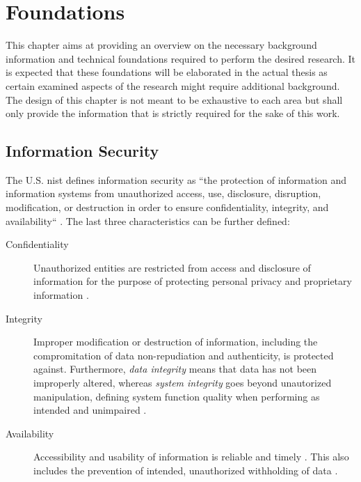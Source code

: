 \chapter{Foundations} \label{ch:foundations}
This chapter aims at providing an overview on the necessary background information and technical foundations required to perform the desired research. It is expected that these foundations will be elaborated in the actual thesis as certain examined aspects of the research might require additional background. The design of this chapter is not meant to be exhaustive to each area but shall only provide the information that is strictly required for the sake of this work.

\section{Information Security} \label{sec:foundations-security}

The U.S. \acf{nist} defines information security as ``the protection of information and information systems from unauthorized access, use, disclosure, disruption, modification, or destruction in order to ensure confidentiality, integrity, and availability`` \cite{nieles_introduction_2017}. The last three characteristics can be further defined:
		
	\begin{description}
		\item[Confidentiality] Unauthorized entities are restricted from access and disclosure of information for the purpose of protecting personal privacy and proprietary information \cite{nieles_introduction_2017}.
		\item[Integrity] Improper modification or destruction of information, including the compromitation of data non-repudiation and authenticity, is protected against. Furthermore, \textit{data integrity} means that data has not been improperly altered, whereas \textit{system integrity} goes beyond unautorized manipulation, defining system function quality when performing as intended and unimpaired \cite{nieles_introduction_2017}.
		\item[Availability] Accessibility and usability of information is reliable and timely \cite{nieles_introduction_2017}. This also includes the prevention of intended, unauthorized withholding of data \cite[p. 36]{fischer-hubner_it-security_2001}.
	\end{description}
		

